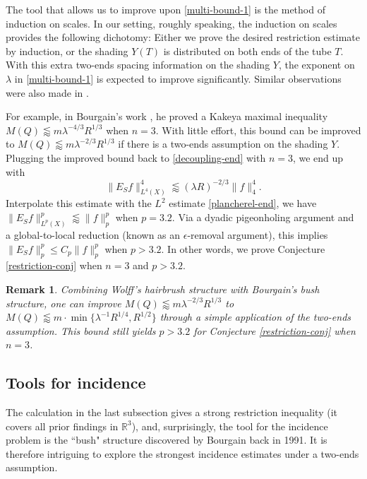 \documentclass{amsart}
\numberwithin{equation}{section}
\newtheorem{remark}[theorem]{Remark}
\newcommand{\la}{\lambda}
\newcommand{\ZR}{\mathbb{R}}
\begin{document}
\smallskip

The tool that allows us to improve upon \eqref{multi-bound-1} is the method of induction on scales.
In our setting, roughly speaking, the induction on scales provides the following dichotomy: 
Either we prove the desired restriction estimate by induction, or the shading $Y(T)$ is distributed on both ends of the tube $T$. 
With this extra two-ends spacing information on the shading $Y$, the exponent on $\la$ in \eqref{multi-bound-1} is expected to improve significantly.
Similar observations were also made in \cite{Wolff-Kakeya,Wolff-X-ray,Katz-Tao-Kakeya-maximal}. 

For example, in Bourgain's work \cite{Bourgain-Besicovitch}, he proved a Kakeya maximal inequality $M(Q)\lessapprox m \la^{-4/3}R^{1/3}$ when $n=3$. 
With little effort, this bound can be improved to $M(Q)\lessapprox m \la^{-2/3}R^{1/3}$ if there is a two-ends assumption on the shading $Y$. 
Plugging the improved bound back to \eqref{decoupling-end} with $n=3$, we end up with
\begin{equation}
    \|E_Sf\|_{L^4(X)}^4\lessapprox (\la R)^{-2/3}\|f\|_4^4.
\end{equation} 
Interpolate this estimate with the $L^2$ estimate \eqref{plancherel-end}, we have $\|E_Sf\|_{L^p(X)}^p\lessapprox \|f\|_p^p$ when $p=3.2$.
Via a dyadic pigeonholing argument and a global-to-local reduction (known as an $\epsilon$-removal argument), this implies $\|E_Sf\|_{p}^p\leq C_p \|f\|_p^p$ when $p>3.2$.
In other words, we prove Conjecture \ref{restriction-conj} when $n=3$ and $p>3.2$. 

\begin{remark}
\rm

Combining Wolff's hairbrush structure with Bourgain's bush structure, one can improve $M(Q)\lessapprox m \la^{-2/3}R^{1/3}$ to $M(Q)\lessapprox m\cdot \min\{\la^{-1}R^{1/4}, R^{1/2}\}$ through a simple application of the two-ends assumption.
This bound still yields $p>3.2$ for Conjecture \ref{restriction-conj} when $n=3$.
\end{remark}

\medskip

\subsection{Tools for incidence}

The calculation in the last subsection gives a strong restriction inequality (it covers all prior findings in $\ZR^3$), and, surprisingly, the tool for the incidence problem is the ``bush" structure discovered by Bourgain back in 1991.
It is therefore intriguing to explore the strongest incidence estimates under a two-ends assumption.
\end{document}
